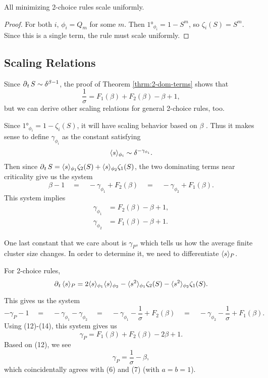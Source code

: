 \documentclass[twoside,10pt]{article}
\begin{document}
\begin{cor}
All minimizing 2-choice rules scale uniformly.
\end{cor}
\begin{proof}
	For both $i$, $\phi_i = Q_m$ for some $m$. Then $\ang{1}_{\phi_i} = 1 - S^{m}$, so $\zeta_i(S) = S^{m}$. Since this is a single term, the rule must scale uniformly.
\end{proof}

\subsection{Scaling Relations}

Since $\operatorname{\partial}_{t}{S} \sim \delta^{\beta-1}$, the proof of Theorem \ref{thrm:2-dom-terms} shows that
\begin{equation}
	\frac{1}{\sigma} = F_1(\beta) + F_2(\beta) - \beta + 1,
\end{equation}
but we can derive other scaling relations for general 2-choice rules, too.

Since $\ang{1}_{\phi_i} = 1 - \zeta_i(S)$, it will have scaling behavior based on $\beta$ . Thus it makes sense to define $\gamma_{\phi_i}$ as the constant satisfying
\[
\langle s \rangle_{\phi_i} \sim \delta^{-\gamma_{\phi_i}}.
\] 
Then since $\operatorname{\partial}_{t}{S} = \langle s \rangle_{\phi_1}\zeta_2(S) + \langle s \rangle_{\phi_2}\zeta_1(S)$, the two dominating terms near criticality give us the system
\[
	\beta -1 \quad=\quad -\gamma_{\phi_1} + F_2(\beta) \quad=\quad -\gamma_{\phi_2} + F_1(\beta).
\] 
This system implies
\begin{align}
	\gamma_{\phi_1} &= F_2(\beta) - \beta + 1,\\
	\gamma_{\phi_2} &= F_1(\beta) - \beta + 1.
\end{align}

One last constant that we care about is $\gamma_{P}$, which tells us how the average finite cluster size changes. In order to determine it, we need to differentiate $\langle s \rangle_{P}$.

\begin{prop}
For 2-choice rules,
\[
	\operatorname{\partial}_{t}{\langle s \rangle_{P}} = 2\langle s \rangle_{\phi_1}\langle s \rangle_{\phi_2} - \langle s^2 \rangle_{\phi_1}\zeta_2(S) - \langle s^2 \rangle_{\phi_2}\zeta_1(S).
\] 
\end{prop}

This gives us the system
\[
	-\gamma_{P}-1 \quad=\quad -\gamma_{\phi_1}-\gamma_{\phi_2} \quad=\quad -\gamma_{\phi_1}-\frac{1}{\sigma} +F_2(\beta) \quad=\quad -\gamma_{\phi_2}-\frac{1}{\sigma} + F_1(\beta).
\] 
Using (12)-(14), this system gives us
\begin{equation}
	\gamma_{P} = F_1(\beta)+F_2(\beta) - 2\beta + 1.
\end{equation}
Based on (12), we see
\[
\gamma_{P} = \frac{1}{\sigma} -\beta,
\] which coincidentally agrees with (6) and (7) (with $a=b=1$).
\end{document}
